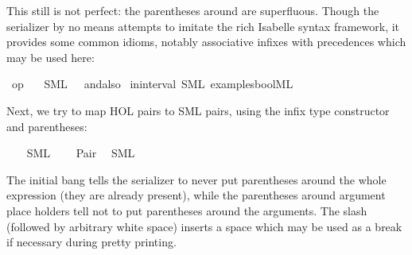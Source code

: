 \begin{isabellebody}
\begin{isamarkuptext}
  This still is not perfect: the parentheses
  around  are superfluous.  Though the serializer
  by no means attempts to imitate the rich Isabelle syntax
  framework, it provides some common idioms, notably
  associative infixes with precedences which may be used here:%
\end{isamarkuptext}%
\isamarkuptrue%
\isamarkupfalse%
\ {\isachardoublequoteopen}op\ {\isasymand}{\isachardoublequoteclose}\isanewline
\ \ {\isacharparenleft}SML\ \ {}\ {\isachardoublequoteopen}andalso{\isachardoublequoteclose}{\isacharparenright}\isanewline
\isanewline
{}\isamarkupfalse%
\ in{\isacharunderscore}interval\ {\isacharparenleft}SML\ {\isachardoublequoteopen}examples{\isacharslash}bool{}{\isachardot}ML{\isachardoublequoteclose}{\isacharparenright}%
\begin{isamarkuptext}%

  Next, we try to map HOL pairs to SML pairs, using the
  infix \qt{ * } type constructor and parentheses:%
\end{isamarkuptext}%
\isamarkuptrue%
\isanewline
{}\isamarkupfalse%
\ {\isacharasterisk}\isanewline
\ \ {\isacharparenleft}SML\ \ {}\ {\isachardoublequoteopen}{\isacharasterisk}{\isachardoublequoteclose}{\isacharparenright}\isanewline
\isanewline
{}\isamarkupfalse%
\ Pair\isanewline
\ \ {\isacharparenleft}SML\ {\isachardoublequoteopen}{\isacharbang}{\isacharparenleft}{\isacharparenleft}{\isacharunderscore}{\isacharparenright}{\isacharcomma}{\isacharslash}\ {\isacharparenleft}{\isacharunderscore}{\isacharparenright}{\isacharparenright}{\isachardoublequoteclose}{\isacharparenright}%
\begin{isamarkuptext}%
The initial bang \qt{!} tells the serializer to never put
  parentheses around the whole expression (they are already present),
  while the parentheses around argument place holders
  tell not to put parentheses around the arguments.
  The slash \qt{/} (followed by arbitrary white space)
  inserts a space which may be used as a break if necessary
  during pretty printing.


\end{isamarkuptext}
\end{isabellebody}
